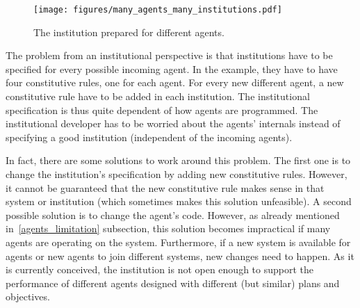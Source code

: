\documentclass[runningheads]{llncs}
\begin{document}
\begin{figure*}[!ht]\centering %
	\texttt{[image: figures/many\_agents\_many\_institutions.pdf]}
	\caption{The institution prepared for different agents.}
	\label{fig:many_agents_many_institutions}
\end{figure*}

The problem from an institutional perspective is that institutions have to be specified for every possible incoming agent. In the example, they have to have four constitutive rules, one for each agent. For every new different agent, a new constitutive rule have to be added in each institution. The institutional specification is thus quite dependent of how agents are programmed. The institutional developer has to be worried about the agents' internals instead of specifying a good institution (independent of the incoming agents).


In fact, there are some solutions to work around this problem. The first one is to
change the institution's specification by adding new constitutive rules. However, it cannot be guaranteed that the new constitutive rule makes sense in that system or institution (which sometimes makes this solution unfeasible). A second possible solution is to
change the agent's code. However, as already mentioned in~\ref{agents_limitation} subsection, this solution becomes impractical if many agents are operating on the system.
Furthermore, if a new system is available for agents or new agents to join different systems, new changes need to happen. As it is currently conceived, the institution is not open enough to support the performance of different agents designed with different (but similar) plans and objectives.

\end{document}
